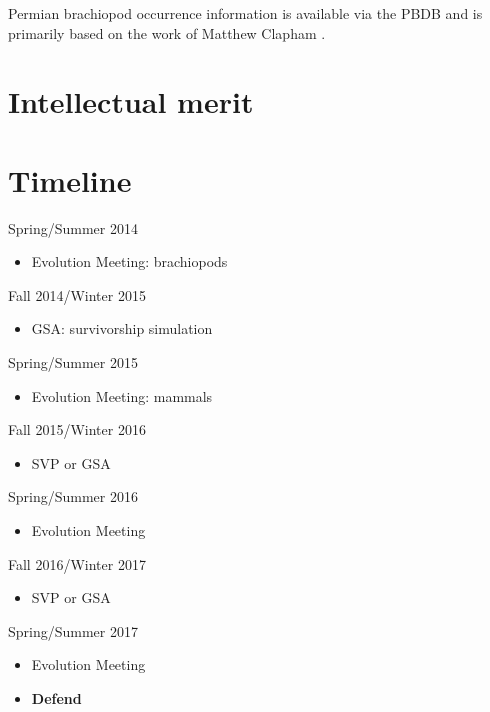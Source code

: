 \documentclass[12pt,letterpaper]{article}
\begin{document}
Permian brachiopod occurrence information is available via the PBDB and is primarily based on the work of Matthew Clapham \citep{Clapham2006,Clapham2008a,Clapham2007a,Clapham2012,Clapham2007}.


\section{Intellectual merit}



\clearpage
\section{Timeline}

Spring/Summer 2014
\begin{itemize}
  \item Evolution Meeting: brachiopods
\end{itemize}

Fall 2014/Winter 2015
\begin{itemize}
  \item GSA: survivorship simulation
\end{itemize}

Spring/Summer 2015
\begin{itemize}
  \item Evolution Meeting: mammals
\end{itemize}

Fall 2015/Winter 2016
\begin{itemize}
  \item SVP or GSA
\end{itemize}

Spring/Summer 2016
\begin{itemize}
  \item Evolution Meeting
\end{itemize}

Fall 2016/Winter 2017
\begin{itemize}
  \item SVP or GSA
\end{itemize}

Spring/Summer 2017
\begin{itemize}
  \item Evolution Meeting
  \item \textbf{Defend}
\end{itemize}



\clearpage


\end{document}
